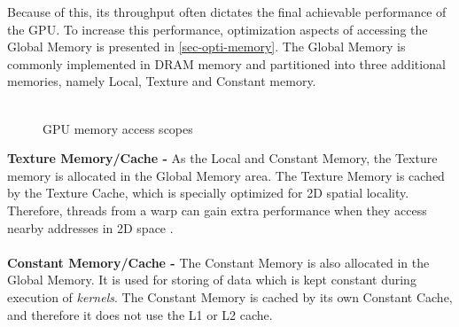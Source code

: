 Because of this, its throughput often dictates the final achievable performance of the GPU.
To increase this performance, optimization aspects of accessing the Global Memory is presented in \cref{sec-opti-memory}.
The Global Memory is commonly implemented in DRAM memory and partitioned into three additional memories, namely Local, Texture and Constant memory.
\\\\
\begin{figure}[H]
	\centering
	\caption{GPU memory access scopes}
	\label{fig:hw-memory-model}
\end{figure}
\noindent \textbf{Texture Memory/Cache -} As the Local and Constant Memory, the Texture memory is allocated in the Global Memory area.
The Texture Memory is cached by the Texture Cache, which is specially optimized for 2D spatial locality. Therefore, threads from a warp can gain extra performance when they access nearby addresses in 2D space \cite{Li2016}.
\\\\
\textbf{Constant Memory/Cache -} The Constant Memory is also allocated in the Global Memory.
It is used for storing of data which is kept constant during execution of \textit{kernels}.
The Constant Memory is cached by its own Constant Cache, and therefore it does not use the L1 or L2 cache.

